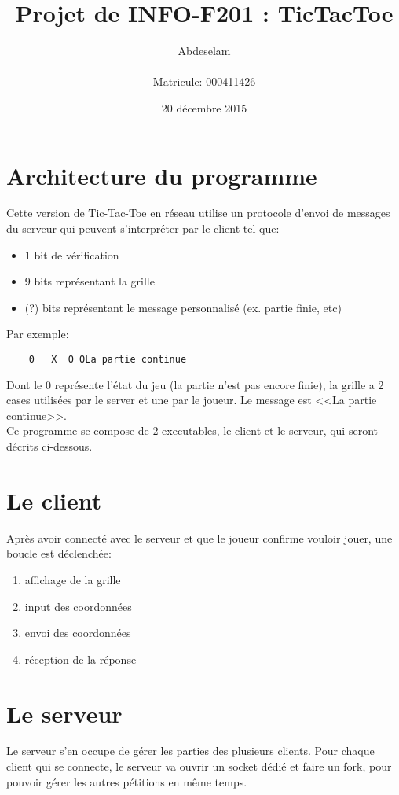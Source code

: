 \documentclass{article}
\title{Projet de INFO-F201 : \og TicTacToe\fg\\}
\author{Abdeselam \bsc{El-Haman Abdeselam}\\\\Matricule: 000411426}
\date{20 décembre 2015}
\begin{document}
\maketitle

\section*{Architecture du programme}
	Cette version de Tic-Tac-Toe en réseau utilise un protocole d'envoi de messages du serveur qui peuvent s'interpréter par le client tel que:

\begin{itemize}
	\item 1 bit de vérification
	\item 9 bits représentant la grille 
	\item (?) bits représentant le message personnalisé (ex. partie finie, etc)
\end{itemize}	
Par exemple:
	\begin{verbatim}
	0   X  O OLa partie continue
	\end{verbatim}
	Dont le 0 représente l'état du jeu (la partie n'est pas encore finie), la grille a 2 cases utilisées par le server et une par le joueur. Le message est <<La partie continue>>.\\
	
	Ce programme se compose de 2 executables, le client et le serveur, qui seront décrits ci-dessous.
	
\section*{Le client}
	Après avoir connecté avec le serveur et que le joueur confirme vouloir jouer, une boucle est déclenchée:
	\begin{enumerate}
		\item affichage de la grille
		\item input des coordonnées
		\item envoi des coordonnées
		\item réception de la réponse
	\end{enumerate}
	
\section*{Le serveur}
	Le serveur s'en occupe de gérer les parties des plusieurs clients. Pour chaque client qui se connecte, le serveur va ouvrir un socket dédié et faire un fork, pour pouvoir gérer les autres pétitions en même temps.\\
	
\end{document}
